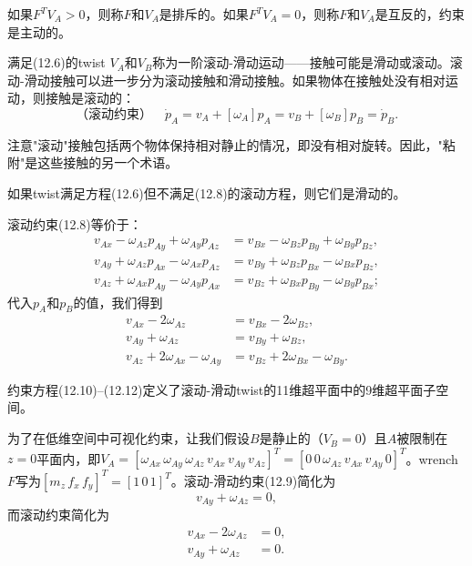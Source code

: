 \documentclass[12pt,a4paper]{article}
\begin{document}
如果$F^T V_A > 0$，则称$F$和$V_A$是排斥的。如果$F^T V_A = 0$，则称$F$和$V_A$是互反的，约束是主动的。

满足(12.6)的twist $V_A$和$V_B$称为一阶滚动-滑动运动——接触可能是滑动或滚动。滚动-滑动接触可以进一步分为滚动接触和滑动接触。如果物体在接触处没有相对运动，则接触是滚动的：
\begin{equation}
\text{（滚动约束）} \quad \dot{p}_A = v_A + [\omega_A]p_A = v_B + [\omega_B]p_B = \dot{p}_B.
\label{eq:12.8}
\end{equation}

注意"滚动"接触包括两个物体保持相对静止的情况，即没有相对旋转。因此，"粘附"是这些接触的另一个术语。

如果twist满足方程(12.6)但不满足(12.8)的滚动方程，则它们是滑动的。

滚动约束(12.8)等价于：
\begin{align}
v_{Ax} - \omega_{Az} p_{Ay} + \omega_{Ay} p_{Az} &= v_{Bx} - \omega_{Bz} p_{By} + \omega_{By} p_{Bz}, \\
v_{Ay} + \omega_{Az} p_{Ax} - \omega_{Ax} p_{Az} &= v_{By} + \omega_{Bz} p_{Bx} - \omega_{Bx} p_{Bz}, \\
v_{Az} + \omega_{Ax} p_{Ay} - \omega_{Ay} p_{Ax} &= v_{Bz} + \omega_{Bx} p_{By} - \omega_{By} p_{Bx};
\end{align}
代入$p_A$和$p_B$的值，我们得到
\begin{align}
v_{Ax} - 2\omega_{Az} &= v_{Bx} - 2\omega_{Bz}, \label{eq:12.10} \\
v_{Ay} + \omega_{Az} &= v_{By} + \omega_{Bz}, \label{eq:12.11} \\
v_{Az} + 2\omega_{Ax} - \omega_{Ay} &= v_{Bz} + 2\omega_{Bx} - \omega_{By}. \label{eq:12.12}
\end{align}

约束方程(12.10)–(12.12)定义了滚动-滑动twist的11维超平面中的9维超平面子空间。

为了在低维空间中可视化约束，让我们假设$B$是静止的（$V_B = 0$）且$A$被限制在$z = 0$平面内，即$V_A = [\omega_{Ax} \, \omega_{Ay} \, \omega_{Az} \, v_{Ax} \, v_{Ay} \, v_{Az}]^T = [0 \, 0 \, \omega_{Az} \, v_{Ax} \, v_{Ay} \, 0]^T$。wrench $F$写为$[m_z \, f_x \, f_y]^T = [1 \, 0 \, 1]^T$。滚动-滑动约束(12.9)简化为
\begin{equation}
v_{Ay} + \omega_{Az} = 0,
\end{equation}
而滚动约束简化为
\begin{align}
v_{Ax} - 2\omega_{Az} &= 0, \\
v_{Ay} + \omega_{Az} &= 0.
\end{align}
\end{document}
